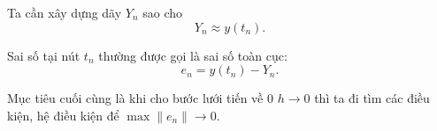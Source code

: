 Ta cần xây dựng dãy $Y_n$ sao cho
\[
    Y_n \approx y(t_n).
\]

Sai số tại nút $t_n$ thường được gọi là sai số toàn cục:
\[
    e_n = y(t_n) - Y_n.
\]

Mục tiêu cuối cùng là khi cho bước lưới tiến về 0 $h \to 0$ thì ta đi tìm các điều kiện, hệ điều kiện để $\max \|e_n\| \to 0$.\\




    
